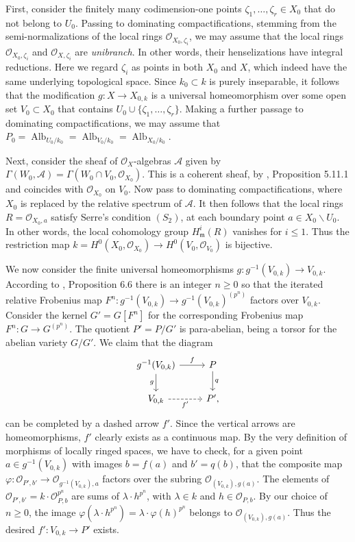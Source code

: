 \documentclass[oneside, 12pt]{amsart}
\theoremstyle{definition}
\theoremstyle{remark}
\newcommand{\shA}{\mathscr{A}}
\newcommand{\Alb}{\operatorname{Alb}}
\newcommand{\maxid}{\mathfrak{m}}
\renewcommand{\O}{\mathscr{O}}
\newcommand{\ra}{\rightarrow}
\begin{document}
First, consider the finitely many codimension-one points 
 $\zeta_1,\ldots,\zeta_r\in X_0$ 
that do not belong to $U_0$.  Passing to dominating compactifications, stemming from the semi-normalizations
of the local rings $\O_{X_0,\zeta_i}$, we may  assume that the local rings $\O_{X_0,\zeta_i}$
and $\O_{X,\zeta_i}$ are \emph{unibranch}. In other words, their henselizations have integral reductions.
Here we regard $\zeta_i$ as points in both $X_0$ and $X$, which indeed have
the same underlying topological space. 
Since $k_0\subset k$ is purely inseparable, it 
 follows that the modification $g:X\ra X_{0,k}$ is a universal homeomorphism over some open set $V_0\subset X_0$
that contains $U_0\cup\{\zeta_1,\ldots,\zeta_r\}$. 
Making a further passage to dominating compactifications, we may assume that  
$P_0=\Alb_{U_0/k_0}=\Alb_{V_0/k_0}=\Alb_{X_0/k_0}$.

Next, consider the sheaf of $\O_X$-algebras $\shA$ given by $\Gamma(W_0,\shA)=\Gamma(W_0\cap V_0,\O_{X_0})$.
This is a coherent sheaf, by \cite{EGA IVb}, Proposition 5.11.1 
and coincides with $\O_{X_0}$ on $V_0$. Now pass to dominating compactifications, where  $X_0$ is replaced by the
relative spectrum of $\shA$. It then follows that the local rings $R=\O_{X_0,a}$ satisfy Serre's condition $(S_2)$,
at each boundary point $a\in X_0\smallsetminus U_0$. In other words, the local cohomology group $H^i_{\maxid}(R)$
vanishes for $i\leq 1$. Thus the restriction map $k=H^0(X_0,\O_{X_0})\ra H^0(V_0,\O_{V_0})$ is bijective.

We now consider the finite universal homeomorphisms $g:g^{-1}(V_{0,k})\ra V_{0,k}$.
According to \cite{Kollar 1997}, Proposition 6.6 there is an integer $n\geq 0$
so that the iterated relative Frobenius map $F^n: g^{-1}(V_{0,k})\ra g^{-1}(V_{0,k})^{(p^n)}$ factors over
$V_{0,k}$. Consider the kernel $G'=G[F^n]$ for the corresponding Frobenius map $F^n:G\ra G^{(p^n)}$.
The quotient $P'=P/G'$ is para-abelian, being a  torsor for the abelian variety $G/G'$.
We claim that the diagram
$$
\begin{tikzcd} 
g^{-1}(V_{0,k})\ar[r,"f"]\ar[d, "g"']	& P\ar[d,"q"]\\
V_{0,k}\ar[r,dashed,"f'"']		& P',
\end{tikzcd}
$$
can be completed by a dashed arrow $f'$. Since the vertical arrows are   homeomorphisms, $f'$ clearly exists
as a continuous map. By the very definition of morphisms of locally ringed spaces,
we   have to check, for a given point $a\in g^{-1}(V_{0,k})$ with images  $b=f(a)$ and $b'=q(b)$,
that the composite map $\varphi:\O_{P',b'}\ra \O_{g^{-1}(V_{0,k}),a}$ factors over the subring $\O_{(V_{0,k}),g(a)}$.
The elements of  $\O_{P',b'}=k\cdot \O_{P,b}^{p^n}$ are sums of   $\lambda\cdot h^{p^n}$,
with $\lambda\in k$ and $h\in \O_{P,b}$. By our choice of $n\geq 0$, the image  $\varphi(\lambda\cdot h^{p^n})=\lambda\cdot \varphi(h)^{p^n}$
belongs to $\O_{(V_{0,k}),g(a)}$. Thus the desired $f':V_{0,k}\ra P'$ exists.
\end{document}
